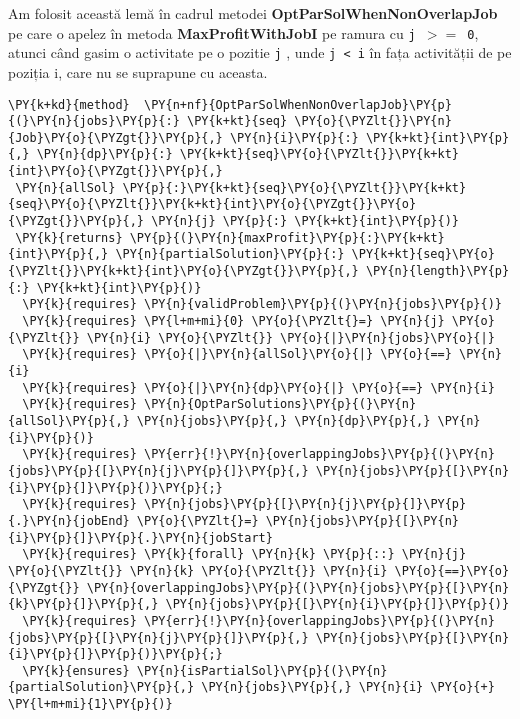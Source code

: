 Am folosit această lemă în cadrul metodei \textbf{OptParSolWhenNonOverlapJob} pe care o apelez în metoda \textbf{MaxProfitWithJobI}  pe ramura cu \texttt{j $>=$ 0}, atunci când gasim o activitate pe o pozitie \texttt{j} , unde \texttt{j < i} în fața activității de pe poziția i, care nu se suprapune cu aceasta.
\begin{footnotesize}
\begin{Verbatim}[commandchars=\\\{\}, fontsize=\footnotesize]
\PY{k+kd}{method}  \PY{n+nf}{OptParSolWhenNonOverlapJob}\PY{p}{(}\PY{n}{jobs}\PY{p}{:} \PY{k+kt}{seq} \PY{o}{\PYZlt{}}\PY{n}{Job}\PY{o}{\PYZgt{}}\PY{p}{,} \PY{n}{i}\PY{p}{:} \PY{k+kt}{int}\PY{p}{,} \PY{n}{dp}\PY{p}{:} \PY{k+kt}{seq}\PY{o}{\PYZlt{}}\PY{k+kt}{int}\PY{o}{\PYZgt{}}\PY{p}{,}
 \PY{n}{allSol} \PY{p}{:}\PY{k+kt}{seq}\PY{o}{\PYZlt{}}\PY{k+kt}{seq}\PY{o}{\PYZlt{}}\PY{k+kt}{int}\PY{o}{\PYZgt{}}\PY{o}{\PYZgt{}}\PY{p}{,} \PY{n}{j} \PY{p}{:} \PY{k+kt}{int}\PY{p}{)}
 \PY{k}{returns} \PY{p}{(}\PY{n}{maxProfit}\PY{p}{:}\PY{k+kt}{int}\PY{p}{,} \PY{n}{partialSolution}\PY{p}{:} \PY{k+kt}{seq}\PY{o}{\PYZlt{}}\PY{k+kt}{int}\PY{o}{\PYZgt{}}\PY{p}{,} \PY{n}{length}\PY{p}{:} \PY{k+kt}{int}\PY{p}{)}
  \PY{k}{requires} \PY{n}{validProblem}\PY{p}{(}\PY{n}{jobs}\PY{p}{)}
  \PY{k}{requires} \PY{l+m+mi}{0} \PY{o}{\PYZlt{}=} \PY{n}{j} \PY{o}{\PYZlt{}} \PY{n}{i} \PY{o}{\PYZlt{}} \PY{o}{|}\PY{n}{jobs}\PY{o}{|}
  \PY{k}{requires} \PY{o}{|}\PY{n}{allSol}\PY{o}{|} \PY{o}{==} \PY{n}{i}
  \PY{k}{requires} \PY{o}{|}\PY{n}{dp}\PY{o}{|} \PY{o}{==} \PY{n}{i}
  \PY{k}{requires} \PY{n}{OptParSolutions}\PY{p}{(}\PY{n}{allSol}\PY{p}{,} \PY{n}{jobs}\PY{p}{,} \PY{n}{dp}\PY{p}{,} \PY{n}{i}\PY{p}{)}
  \PY{k}{requires} \PY{err}{!}\PY{n}{overlappingJobs}\PY{p}{(}\PY{n}{jobs}\PY{p}{[}\PY{n}{j}\PY{p}{]}\PY{p}{,} \PY{n}{jobs}\PY{p}{[}\PY{n}{i}\PY{p}{]}\PY{p}{)}\PY{p}{;}
  \PY{k}{requires} \PY{n}{jobs}\PY{p}{[}\PY{n}{j}\PY{p}{]}\PY{p}{.}\PY{n}{jobEnd} \PY{o}{\PYZlt{}=} \PY{n}{jobs}\PY{p}{[}\PY{n}{i}\PY{p}{]}\PY{p}{.}\PY{n}{jobStart}
  \PY{k}{requires} \PY{k}{forall} \PY{n}{k} \PY{p}{::} \PY{n}{j} \PY{o}{\PYZlt{}} \PY{n}{k} \PY{o}{\PYZlt{}} \PY{n}{i} \PY{o}{==}\PY{o}{\PYZgt{}} \PY{n}{overlappingJobs}\PY{p}{(}\PY{n}{jobs}\PY{p}{[}\PY{n}{k}\PY{p}{]}\PY{p}{,} \PY{n}{jobs}\PY{p}{[}\PY{n}{i}\PY{p}{]}\PY{p}{)} 
  \PY{k}{requires} \PY{err}{!}\PY{n}{overlappingJobs}\PY{p}{(}\PY{n}{jobs}\PY{p}{[}\PY{n}{j}\PY{p}{]}\PY{p}{,} \PY{n}{jobs}\PY{p}{[}\PY{n}{i}\PY{p}{]}\PY{p}{)}\PY{p}{;}
  \PY{k}{ensures} \PY{n}{isPartialSol}\PY{p}{(}\PY{n}{partialSolution}\PY{p}{,} \PY{n}{jobs}\PY{p}{,} \PY{n}{i} \PY{o}{+} \PY{l+m+mi}{1}\PY{p}{)}

\end{Verbatim}
\end{footnotesize}

